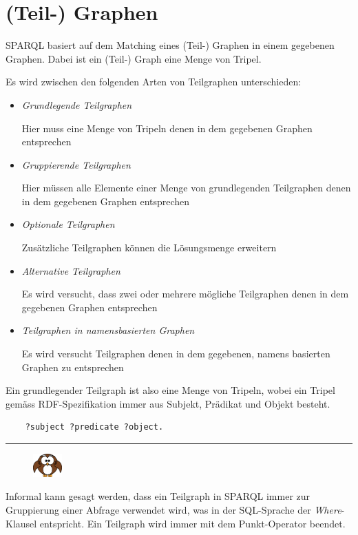 \section{(Teil-) Graphen}
\label{sec:sparql_graph}

SPARQL basiert auf dem Matching eines (Teil-) Graphen in einem gegebenen Graphen. Dabei ist ein (Teil-) Graph eine Menge von Tripel.

Es wird zwischen den folgenden Arten von Teilgraphen unterschieden:
\begin{itemize}
\item \textit{Grundlegende Teilgraphen}

Hier muss eine Menge von Tripeln denen in dem gegebenen Graphen entsprechen

\item \textit{Gruppierende Teilgraphen}

Hier müssen alle Elemente einer Menge von grundlegenden Teilgraphen denen in dem gegebenen Graphen entsprechen

\item \textit{Optionale Teilgraphen}

Zusätzliche Teilgraphen können die Lösungsmenge erweitern

\item \textit{Alternative Teilgraphen}

Es wird versucht, dass zwei oder mehrere mögliche Teilgraphen denen in dem gegebenen Graphen entsprechen

\item \textit{Teilgraphen in namensbasierten Graphen}

Es wird versucht Teilgraphen denen in dem gegebenen, namens basierten Graphen zu entsprechen
\end{itemize}

Ein grundlegender Teilgraph ist also eine Menge von Tripeln, wobei ein Tripel gemäss RDF-Spezifikation immer aus Subjekt, Prädikat und Objekt besteht.~\cite[3.1 Triples]{w3rdf}

\lstset{language=XML}
\begin{lstlisting}
    ?subject ?predicate ?object.
\end{lstlisting}

\noindent\rule[1ex]{\textwidth}{1pt}
\begin{figure}
    \vspace{-16pt}
    \includegraphics[width=0.1\textwidth]{bilder/owl.png}
\end{figure}
Informal kann gesagt werden, dass ein Teilgraph in SPARQL immer zur Gruppierung einer Abfrage verwendet wird, was in der SQL-Sprache der \textit{Where}-Klausel entspricht. Ein Teilgraph wird immer mit dem Punkt-Operator beendet.


